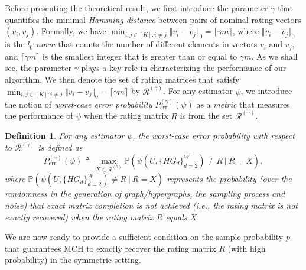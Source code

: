 \documentclass{article}
\newtheorem{definition}{Definition}
\begin{document}
Before presenting the theoretical result, we first introduce the parameter $\gamma$ that quantifies the minimal \emph{Hamming distance} between pairs of nominal rating vectors $(v_{i}, v_{j})$. Formally, we have $\min_{i,j\in [K]: i \ne j}\Vert v_{i} - v_{j} \Vert_0 = \lceil \gamma m \rceil$, where $\Vert v_{i} - v_{j} \Vert_0$ is the \emph{$l_0$-norm} that counts the number of different elements in vectors $v_{i}$ and $v_{j}$, and $\lceil \gamma m \rceil$ is the smallest integer that is greater than or equal to $\gamma m$. As we shall see, the parameter $\gamma$ plays a key role in
characterizing the performance of our algorithm. We then denote the set of rating matrices that satisfy  $\min_{i,j\in [K]: i \ne j}\Vert v_i - v_j \Vert_0 = \lceil \gamma m \rceil$ by $\mathcal{R}^{(\gamma)}$.
For any estimator $\psi$, we introduce the notion of \emph{worst-case error probability} $P_{\mathrm{err}}^{(\gamma)}(\psi)$ as a \emph{metric} that measures the performance of $\psi$ when the rating matrix $R$ is from the set $\mathcal{R}^{(\gamma)}$.

\begin{definition}
{For any estimator $\psi$, the worst-case error probability with respect to $\mathcal{R}^{(\gamma)}$ is defined as 
\begin{equation}\label{eq2}
    P_{\mathrm{err}}^{(\gamma)}(\psi) \triangleq \max_{X \in \mathcal{R}^{(\gamma)}} \mathbb{P}(\psi(U, \{ HG_d \}_{d=2}^W) \neq R \ | \ R=X ),
\end{equation}
where $\mathbb{P}(\psi(U, \{ HG_d \}_{d=2}^W) \neq R \ | \ R=X )$ represents the probability (over the randomness in the generation of graph/hypergraphs, the sampling process and noise) that exact matrix completion is not achieved (i.e., the rating matrix is not exactly recovered)  when the rating matrix $R$ equals $X$.
}
\end{definition}




We are now ready to provide a sufficient condition on the sample probability $p$ that guarantees MCH to exactly recover the rating matrix $R$ (with high probability) in the symmetric setting.
\end{document}
